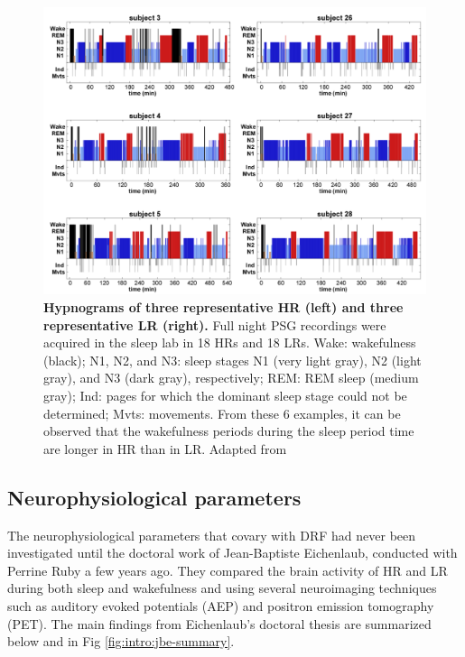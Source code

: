 \begin{figure}[htb]
	\includegraphics[width=\textwidth]{Fig/Intro/Intro_JBE_sleep/Intro_JBE_sleep.png}
	\caption[Hypnograms of typical high and low dream recallers]{\textbf{Hypnograms of three representative HR (left) and three representative LR (right).} Full night PSG recordings were acquired in the sleep lab in 18 HRs and 18 LRs. Wake: wakefulness (black); N1, N2, and N3: sleep stages N1 (very light gray), N2 (light gray), and N3 (dark gray), respectively; REM: REM sleep (medium gray); Ind: pages for which the dominant sleep stage could not be determined; Mvts: movements. From these 6 examples, it can be observed that the wakefulness periods during the sleep period time are longer in HR than in LR. Adapted from \citet{eichenlaub_brain_2014}}
	\label{fig:intro:jbe-sleep}
\end{figure}

\subsection{Neurophysiological parameters}
\label{sec:dream-recall:param:neuro}

The neurophysiological parameters that covary with DRF had never been investigated until the doctoral work of Jean-Baptiste Eichenlaub, conducted with Perrine Ruby a few years ago. They compared the brain activity of HR and LR during both sleep and wakefulness and using several neuroimaging techniques such as auditory evoked potentials (AEP) and positron emission tomography (PET). The main findings from Eichenlaub’s doctoral thesis are summarized below and in Fig \ref{fig:intro:jbe-summary}.

